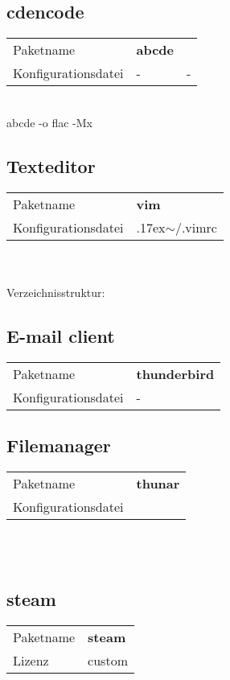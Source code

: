 \subsection{cdencode}
\begin{tabular}{l|l|l}
Paketname & \textbf{abcde}  \\ 
Konfigurationsdatei & - & - \\
\end{tabular}
\\
abcde -o flac -Mx

\subsection{Texteditor}
\begin{tabular}{l|l}
Paketname & \textbf{vim} \\ 
Konfigurationsdatei & {{\raise.17ex\hbox{$\scriptstyle\mathtt{\sim}$}}/.vimrc} \\
\end{tabular}
\\ \\
Verzeichnisstruktur:  

\subsection{E-mail client}
\begin{tabular}{l|l}
Paketname & \textbf{thunderbird} \\ 
Konfigurationsdatei & - \\
\end{tabular}

\subsection{Filemanager}
\begin{tabular}{l|l}
Paketname & \textbf{thunar} \\ 
Konfigurationsdatei & ~ \\
\end{tabular}
\\ \\

\subsection{steam}
\begin{tabular}{l|l}
Paketname & \textbf{steam} \\ 
Lizenz & custom \\
\end{tabular}
\\ \\ \\


